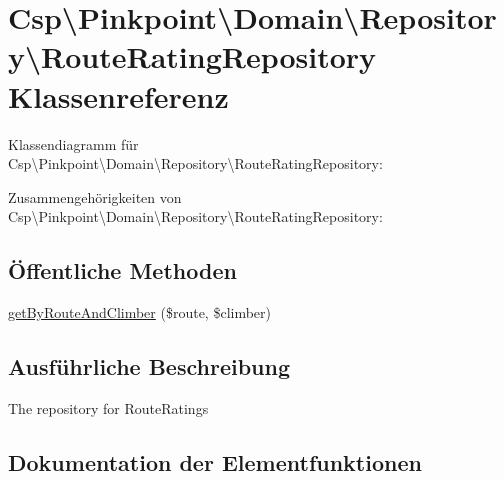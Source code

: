 \hypertarget{classCsp_1_1Pinkpoint_1_1Domain_1_1Repository_1_1RouteRatingRepository}{}\section{Csp\textbackslash{}Pinkpoint\textbackslash{}Domain\textbackslash{}Repository\textbackslash{}Route\+Rating\+Repository Klassenreferenz}
\label{classCsp_1_1Pinkpoint_1_1Domain_1_1Repository_1_1RouteRatingRepository}


Klassendiagramm für Csp\textbackslash{}Pinkpoint\textbackslash{}Domain\textbackslash{}Repository\textbackslash{}Route\+Rating\+Repository\+:


Zusammengehörigkeiten von Csp\textbackslash{}Pinkpoint\textbackslash{}Domain\textbackslash{}Repository\textbackslash{}Route\+Rating\+Repository\+:
\subsection*{Öffentliche Methoden}
\begin{DoxyCompactItemize}
\item 
\hyperlink{classCsp_1_1Pinkpoint_1_1Domain_1_1Repository_1_1RouteRatingRepository_a12fdb01260a69b92e642b578b75864cf}{get\+By\+Route\+And\+Climber} (\$route, \$climber)
\end{DoxyCompactItemize}


\subsection{Ausführliche Beschreibung}
The repository for Route\+Ratings 

\subsection{Dokumentation der Elementfunktionen}
\mbox{\label{classCsp_1_1Pinkpoint_1_1Domain_1_1Repository_1_1RouteRatingRepository_a12fdb01260a69b92e642b578b75864cf}} 
